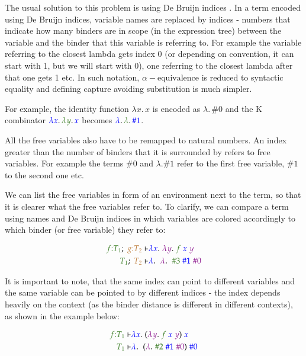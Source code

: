 \documentclass[runningheads]{article}
\newcommand{\tpd}[2]{{#1}{:}{#2}}
\begin{document}
The usual solution to this problem is using De Bruijn indices \cite{Bruijn1972LambdaCN}. In a term encoded using De Bruijn indices, variable names are replaced by indices - numbers that indicate how many binders are in scope (in the expression tree) between the variable and the binder that this variable is referring to. For example the variable referring to the closest lambda gets index 0 (or depending on convention, it can start with 1, but we will start with 0), one referring to the closest lambda after that one gets 1 etc. In such notation, $\alpha-\text{equivalence}$ is reduced to syntactic equality and defining capture avoiding substitution is much simpler.

For example, the identity function $\lambda x. \, x$ is encoded as $\lambda. \, \#0$ and the K combinator ${\color{blue}\lambda x}. \, {\color{OliveGreen}\lambda y}. \, {\color{blue}x}$ becomes ${\color{blue}\lambda}. \, {\color{OliveGreen}\lambda}. \, {\color{blue}\#1}$.

All the free variables also have to be remapped to natural numbers. An index greater than the number of binders that it is surrounded by refers to free variables. For example the terms $\#0$ and $\lambda. \#1$ refer to the first free variable, $\#1$ to the second one etc.

We can list the free variables in form of an environment next to the term, so that it is clearer what the free variables refer to. To clarify, we can compare a term using names and De Bruijn indices in which variables are colored accordingly to which binder (or free variable) they refer to:

\begin{align*}
 {\color{OliveGreen}\tpd{f}{T_1}}; \; {\color{brown}\tpd{g}{T_2}} \vdash & {\color{blue} \lambda x}. \; {\color{Plum}\lambda y}. \; {\color{OliveGreen}f} \; {\color{blue}x} \; {\color{Plum}y} \\
  {\color{OliveGreen} T_1}; \; {\color{brown}T_2} \vdash & {\color{blue} \lambda}. \;\; {\color{Plum}\lambda}. \;\; {\color{OliveGreen} \#3} \; {\color{blue}\#1} \; {\color{Plum} \#0}
\end{align*}

It is important to note, that the same index can point to different variables and the same variable can be pointed to by different indices - the index depends heavily on the context (as the binder distance is different in different contexts), as shown in the example below:

\begin{align*}
{\color{OliveGreen}\tpd{f}{T_1}} \vdash & {\color{blue} \lambda x}. \; ({\color{Plum}\lambda y}. \; {\color{OliveGreen}f} \; {\color{blue}x} \; {\color{Plum}y}) \; {\color{blue}x} \\
{\color{OliveGreen}T_1} \vdash & {\color{blue} \lambda}. \;\; ({\color{Plum}\lambda}. \; {\color{OliveGreen}\#2} \; {\color{blue}\#1} \; {\color{Plum}\#0}) \; {\color{blue}\#0}
\end{align*}
\end{document}
